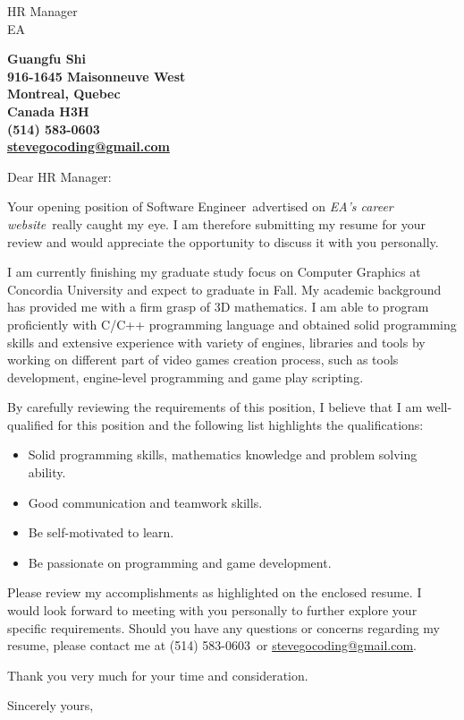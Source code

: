 \documentclass{letter}
\makeatletter
\newcommand{\phcompanyname}             {EA}
\newcommand{\clcontactname}         {HR Manager}
\newcommand{\clcompanyname}         {\phcompanyname}
\newcommand{\cljobpostedtitle}      {Software Engineer}
\newcommand{\cljobpostedplace}      {EA's career website}
\newcommand{\clmyname}              {Guangfu Shi}
\newcommand{\clmyaddr}              {916-1645 Maisonneuve West \\ Montreal, Quebec \\ Canada H3H }
\newcommand{\clmyemail}             {\href{mailto:stevegocoding@gmail.com}{stevegocoding@gmail.com}}
\newcommand{\clmyphone}             {(514) 583-0603}
\makeatother
\begin{document}
\begin{letter}{\clcontactname \\ \clcompanyname}

\begin{center}
    \large\bf\clmyname              \\ 
    \clmyaddr                       \\
    \clmyphone                      \\ 
    \clmyemail                      
\end{center}

\vfill %

\opening{Dear \clcontactname:}

Your opening position of \cljobpostedtitle\ advertised on \emph{\cljobpostedplace}\ really caught my eye. I am therefore submitting my resume for your review and would appreciate the opportunity to discuss it with you personally.

I am currently finishing my graduate study focus on Computer Graphics at Concordia University and expect to graduate in Fall. My academic background has provided me with a firm grasp of 3D mathematics. I am able to program proficiently with C/C++ programming language and obtained solid programming skills and extensive experience with variety of engines, libraries and tools by working on different part of video games creation process, such as tools development, engine-level programming and game play scripting.

By carefully reviewing the requirements of this position, I believe that I am well-qualified for this position and the following list highlights the qualifications:

\begin{itemize}
        \item Solid programming skills, mathematics knowledge and problem solving ability.
        \item Good communication and teamwork skills.
        \item Be self-motivated to learn.
        \item Be passionate on programming and game development.
\end{itemize}

Please review my accomplishments as highlighted on the enclosed resume. I would look forward to meeting with you personally to further explore your specific requirements. Should you have any questions or concerns regarding my resume, please contact me at \clmyphone\ or \clmyemail.

Thank you very much for your time and consideration. 

\closing{Sincerely yours,}
\end{letter}
\end{document}
